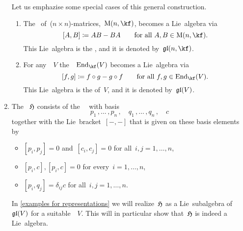 \begin{examples}
\begin{enumerate}
      Let us emphazise some special cases of this general construction.
      \begin{enumerate}
        \item
          The~{\algebra{$\kf$}} of~($n \times n$)-matrices,~$\Mat(n, \kf)$, becomes a Lie~algebra via
          \[
            [A,B]
            \defined
            AB - BA
            \qquad
            \text{for all~$A, B \in \Mat(n, \kf)$.}
          \]
          This Lie~algebra is the , and it is denoted by~$\gllie(n, \kf)$.
        \item
          For any~{\vectorspace{$\kf$}}~$V$ the~{\algebra{$\kf$}}~$\End_{\kf}(V)$ becomes a Lie~algebra via
          \[
            [f, g]
            \defined
            f \circ g - g \circ f
            \qquad
            \text{for all~$f, g \in \End_{\kf}(V)$.}
          \]
          This Lie~algebra is the  of~$V$, and it is denoted by~$\mathfrak{gl}(V)$.
      \end{enumerate}
    \item
      The ~$\mathfrak{H}$ consists of the~~{\vectorspace{$\kf$}} with basis
      \[
        p_1 \,, \dotsc \,, p_n \,,
        \quad
        q_1 \,, \dotsc \,, q_n \,,
        \quad
        c
      \]
      together with the Lie~bracket~$[-,-]$ that is given on these basis elements by
      \begin{itemize}
        \item
          $[p_i, p_j] = 0$ and~$[c_i, c_j] = 0$ for all~$i, j = 1, \dotsc, n$,
        \item
          $[p_i, c], [p_i, c] = 0$ for every~$i = 1, \dotsc, n$,
        \item
          $[p_i, q_j] = \delta_{ij} c$ for all~$i,j = 1, \dotsc, n$.
      \end{itemize}
      In \cref{examples for representations} we will realize~$\mathfrak{H}$ as a Lie~subalgebra of~$\mathfrak{gl}(V)$ for a suitable~\vectorspace{$\kf$}~$V$.
      This will in particular show that~$\mathfrak{H}$ is indeed a Lie~algebra.
  \end{enumerate}
\end{examples}


